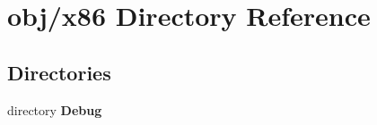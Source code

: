 \section{obj/x86 Directory Reference}
\label{dir_5d43875e4bdcf5d0ace7b54e17c3318a}
\subsection*{Directories}
\begin{DoxyCompactItemize}
\item 
directory {\bf Debug}
\end{DoxyCompactItemize}
